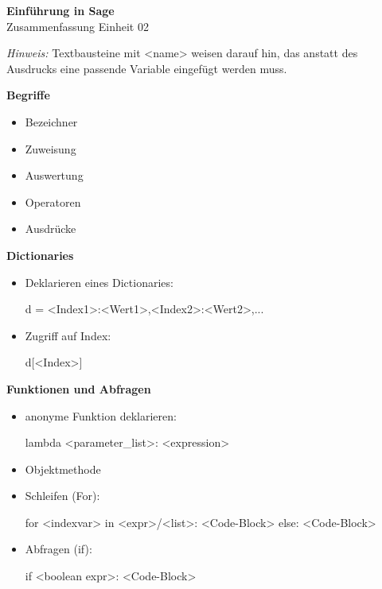 \documentclass[a4paper,9pt,DIV15,twocolumn]{scrartcl}
\begin{document}
\begin{center}
    \textbf{\LARGE Einführung in Sage}\\
    {\large Zusammenfassung Einheit 02}
\end{center}
\textsl{Hinweis:} Textbausteine mit <name> weisen darauf hin, das anstatt des Ausdrucks eine passende Variable eingefügt werden muss.

\medskip
\textbf{Begriffe}

\begin{itemize}
 \item Bezeichner
 \item Zuweisung
 \item Auswertung
 \item Operatoren
 \item Ausdrücke
\end{itemize}

\textbf{Dictionaries}

\begin{itemize}
 \item Deklarieren eines Dictionaries:
\begin{sagein}
d = {<Index1>:<Wert1>,<Index2>:<Wert2>,...}
\end{sagein}
 \item Zugriff auf Index:
\begin{sagein}
d[<Index>]
\end{sagein}
\end{itemize}

\textbf{Funktionen und Abfragen}

\begin{itemize}
 \item anonyme Funktion deklarieren:
\begin{sagein}
lambda <parameter_list>: <expression> 
\end{sagein}
 \item Objektmethode
 \item Schleifen (For):
\begin{sagein}
for <indexvar> in <expr>/<list>:
    <Code-Block>
else:
    <Code-Block>
\end{sagein}
 \item Abfragen (if):
\begin{sagein}
if <boolean expr>:
    <Code-Block>
\end{sagein}

\end{itemize}
\end{document}

